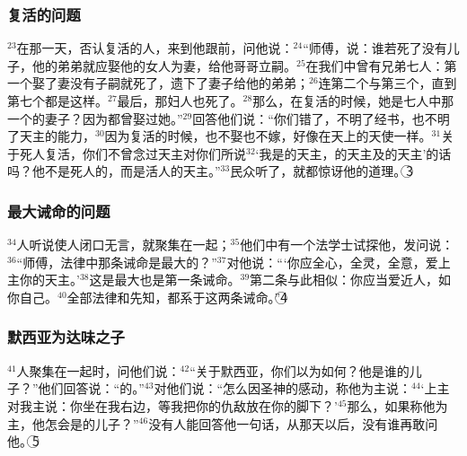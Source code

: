 \subsubsection{复活的问题}
$^{23}$在那一天，否认复活的\UL[撒杜塞]人，来到他跟前，问他说：$^{24}$“师傅，\UL[梅瑟]说：谁若死了没有儿子，他的弟弟就应娶他的女人为妻，给他哥哥立嗣。$^{25}$在我们中曾有兄弟七人：第一个娶了妻没有子嗣就死了，遗下了妻子给他的弟弟；$^{26}$连第二个与第三个，直到第七个都是这样。$^{27}$最后，那妇人也死了。$^{28}$那么，在复活的时候，她是七人中那一个的妻子？因为都曾娶过她。”$^{29}$\UL[耶稣]回答他们说：“你们错了，不明了经书，也不明了天主的能力，$^{30}$因为复活的时候，也不娶也不嫁，好像在天上的天使一样。$^{31}$关于死人复活，你们不曾念过天主对你们所说$^{32}$‘我是\UL[亚巴郎]的天主，\UL[依撒格]的天主及\UL[雅各伯]的天主’的话吗？他不是死人的，而是活人的天主。”$^{33}$民众听了，就都惊讶他的道理。\textcircled{3}


\subsubsection{最大诫命的问题}
$^{34}$\UL[法利塞]人听说\UL[耶稣]使\UL[撒杜塞]人闭口无言，就聚集在一起；$^{35}$他们中有一个法学士试探他，发问说：$^{36}$“师傅，法律中那条诫命是最大的？”$^{37}$\UL[耶稣]对他说：“‘你应全心，全灵，全意，爱上主你的天主。’$^{38}$这是最大也是第一条诫命。$^{39}$第二条与此相似：你应当爱近人，如你自己。$^{40}$全部法律和先知，都系于这两条诫命。”\textcircled{4}


\subsubsection{默西亚为达味之子}
$^{41}$\UL[法利塞]人聚集在一起时，\UL[耶稣]问他们说：$^{42}$“关于默西亚，你们以为如何？他是谁的儿子？”他们回答说：“\UL[达味]的。”$^{43}$\UL[耶稣]对他们说：“怎么\UL[达味]因圣神的感动，称他为主说：$^{44}$‘上主对我主说：你坐在我右边，等我把你的仇敌放在你的脚下？’$^{45}$那么，如果\UL[达味]称他为主，他怎会是\UL[达味]的儿子？”$^{46}$没有人能回答他一句话，从那天以后，没有谁再敢问他。\textcircled{5}


